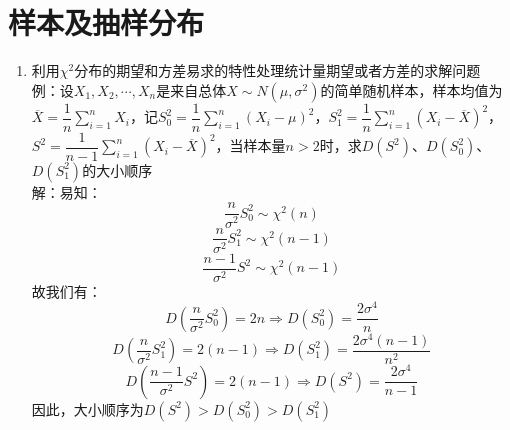 \documentclass[12pt,a4paper,UTF8]{book}
\begin{document}
\section{样本及抽样分布}
\begin{enumerate}
\item 利用$\chi^2$分布的期望和方差易求的特性处理统计量期望或者方差的求解问题\\
例：设$X_1,X_2,\cdots,X_n$是来自总体$X\sim N\left(\mu,\sigma^2\right)$的简单随机样本，样本均值为$\overline{X}=\dfrac{1}{n}\sum\limits_{i=1}^{n}X_i$，记$S_0^2=\dfrac{1}{n}\sum\limits_{i=1}^{n}\left(X_i-\mu\right)^2$，$S_1^2=\dfrac{1}{n}\sum\limits_{i=1}^{n}\left(X_i-\overline{X}\right)^2$，$S^2=\dfrac{1}{n-1}\sum\limits_{i=1}^{n}\left(X_i-\overline{X}\right)^2$，当样本量$n>2$时，求$D\left(S^2\right)$、$D\left(S_0^2\right)$、$D\left(S_1^2\right)$的大小顺序\\
解：易知：
\[\frac{n}{\sigma^2}S_0^2\sim\chi^2\left(n\right)\]
\[\frac{n}{\sigma^2}S_1^2\sim\chi^2\left(n-1\right)\]
\[\frac{n-1}{\sigma^2}S^2\sim\chi^2\left(n-1\right)\]
故我们有：
\[D\left(\frac{n}{\sigma^2}S_0^2\right)=2n\Rightarrow D\left(S_0^2\right)=\frac{2\sigma^4}{n}\]
\[D\left(\frac{n}{\sigma^2}S_1^2\right)=2\left(n-1\right)\Rightarrow D\left(S_1^2\right)=\frac{2\sigma^4\left(n-1\right)}{n^2}\]
\[D\left(\frac{n-1}{\sigma^2}S^2\right)=2\left(n-1\right)\Rightarrow D\left(S^2\right)=\frac{2\sigma^4}{n-1}\]
因此，大小顺序为$D\left(S^2\right)>D\left(S_0^2\right)>D\left(S_1^2\right)$
\end{enumerate}
\end{document}
